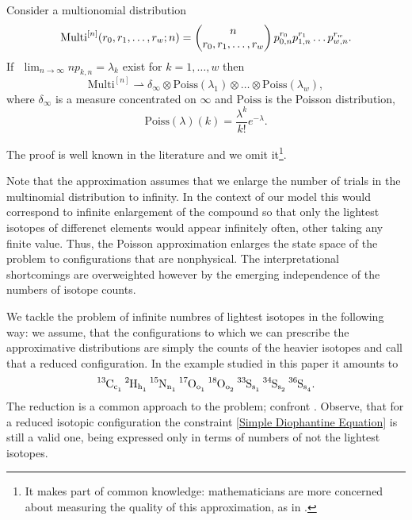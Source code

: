 \begin{lemma}\label{weak convergence of multinomial to Poissons lemma}
	Consider a multionomial distribution 
$$ 
	\mathrm{Multi}^{[n]}(r_0, r_1, \dots, r_w; n) = 
	\begin{pmatrix}
		n \cr r_0, r_1, \dots, r_w
	\end{pmatrix} 
	p_{0,n}^{r_0}  p_{1,n}^{r_1} \dots p_{w,n}^{r_w}. 
$$
	If \,\,$\lim_{n\to \infty} n p_{k,n}= \lambda_k$ exist for $k=1,\dots, w$ then 
\begin{equation}\label{weak convergence of multionial to Poissons equation}
	\mathrm{Multi}^{[n]} \rightharpoonup \delta_\infty \otimes \mathrm{Poiss}( \lambda_1) \otimes \dots \otimes \mathrm{Poiss}( \lambda_w ),	
\end{equation}
	where $\delta_\infty$ is a measure concentrated on $\infty$ and $\mathrm{Poiss}$ is the Poisson distribution, 
$$
	\mathrm{Poiss}(\lambda)(k) 	= \frac{\lambda^k}{k!}e^{-\lambda}.
$$
\end{lemma}
The proof is well known in the literature and we omit it\footnote{It makes part of common knowledge: mathematicians are more concerned about measuring the quality of this approximation, as in \cite{Roos1999OnTheRateOfMultivariatePoissonConvergence}.}. 


Note that the approximation assumes that we enlarge the number of trials in the multinomial distribution to infinity. In the context of our model this would correspond to infinite enlargement of the compound so that only the lightest isotopes of differenet elements would appear infinitely often, other taking any finite value. Thus, the Poisson approximation enlarges the state space of the problem to configurations that are nonphysical. The interpretational shortcomings are overweighted however by the emerging independence of the numbers of isotope counts. 


We tackle the problem of infinite numbres of lightest isotopes in the following way: we assume, that the configurations to which we can prescribe the approximative distributions are simply the counts of the heavier isotopes and call that a reduced configuration. In the example studied in this paper it amounts to
\begin{equation}\label{short chemical formula}
	\text{\heavyMoleculeIsotopic}.
\end{equation}
The reduction is a common approach to the problem; confront \cite{Feller1968IntroductionToProbability}. Observe, that for a reduced isotopic configuration the constraint \eqref{Simple Diophantine Equation} is still a valid one, being expressed only in terms of numbers of not the lightest isotopes. 


